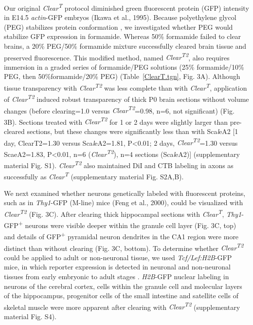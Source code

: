 Our original \emph{Clear\textsuperscript{T}} protocol diminished green fluorescent protein (GFP) intensity in E14.5 \emph{actin}-GFP embryos \cite{} (Ikawa et al., 1995).
Because polyethylene glycol (PEG) stabilizes protein conformation \cite{rawat2010molecular}, we investigated whether PEG would stabilize GFP expression in formamide.
Whereas 50\% formamide failed to clear brains, a 20\% PEG/50\% formamide mixture successfully cleared brain tissue and preserved fluorescence.
This modified method, named \emph{Clear\textsuperscript{T2}}, also requires immersion in a graded series of formamide/PEG solutions (25\% formamide/10\% PEG, then 50\%formamide/20\% PEG) (Table~\ref{ClearT.tgn}, Fig. 3A).
Although tissue transparency with \emph{Clear\textsuperscript{T2}} was less complete than with \emph{Clear\textsuperscript{T}}, application of \emph{Clear\textsuperscript{T2}} induced robust transparency of thick P0 brain sections without volume changes (before clearing=1.0 versus \emph{Clear\textsuperscript{T2}}=0.98, n=6, not significant) (Fig. 3B).
Sections treated with \emph{Clear\textsuperscript{T2}} for 1 or 2 days were slightly larger than pre-cleared sections, but these changes were significantly less than with Sca\emph{l}eA2 [1 day, ClearT2=1.30 versus Sca\emph{l}eA2=1.81, P<0.01; 2 days, \emph{Clear\textsuperscript{T2}}=1.30 versus ScaeA2=1.83, P<0.01, n=6 (\emph{Clear\textsuperscript{T2}}), n=4 sections (Sca\emph{l}eA2)] (supplementary material Fig. S1).
\emph{Clear\textsuperscript{T2}} also maintained DiI and CTB labeling in axons as successfully as \emph{Clear\textsuperscript{T}} (supplementary material Fig. S2A,B).

We next examined whether neurons genetically labeled with fluorescent proteins, such as in \emph{Thy1}-GFP (M-line) mice \cite{}(Feng et al., 2000), could be visualized with \emph{Clear\textsuperscript{T2}} (Fig. 3C).
After clearing thick hippocampal sections with \emph{Clear\textsuperscript{T}}, \emph{Thy1}-GFP\textsuperscript{+} neurons were visible deeper within the granule cell layer (Fig. 3C, top) and details of GFP\textsuperscript{+} pyramidal neuron dendrites in the CA1 region were more distinct than without clearing (Fig. 3C, bottom).
To determine whether \emph{Clear\textsuperscript{T2}} could be applied to adult or non-neuronal tissue, we used \emph{Tcf/Lef:H2B}-GFP mice, in which reporter expression is detected in neuronal and non-neuronal tissues from early embryonic to adult stages \cite{ferrer2010sensitive}.
\emph{H2B}-GFP nuclear labeling in neurons of the cerebral cortex, cells within the granule cell and molecular layers of the hippocampus, progenitor cells of the small intestine and satellite cells of skeletal muscle were more apparent after clearing with \emph{Clear\textsuperscript{T2}} (supplementary material Fig. S4).

